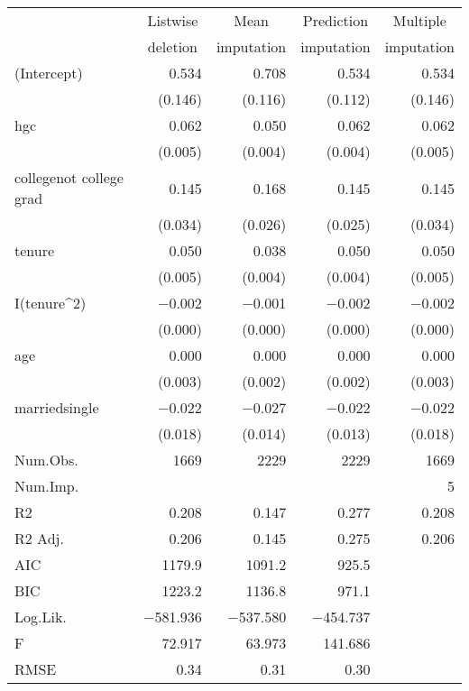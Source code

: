 \documentclass{article}
\begin{document}
\begin{table}[H]
\centering
\small
\begin{tabular}{lrrrr}
\toprule
& \multicolumn{1}{c}{Listwise} & \multicolumn{1}{c}{Mean} & \multicolumn{1}{c}{Prediction} & \multicolumn{1}{c}{Multiple} \\
& \multicolumn{1}{c}{deletion} & \multicolumn{1}{c}{imputation} & \multicolumn{1}{c}{imputation} & \multicolumn{1}{c}{imputation} \\
\midrule
(Intercept) & \num{0.534} & \num{0.708} & \num{0.534} & \num{0.534}\\
& (\num{0.146}) & (\num{0.116}) & (\num{0.112}) & (\num{0.146})\\
hgc & \num{0.062} & \num{0.050} & \num{0.062} & \num{0.062}\\
& (\num{0.005}) & (\num{0.004}) & (\num{0.004}) & \vphantom{1} (\num{0.005})\\
collegenot college grad & \num{0.145} & \num{0.168} & \num{0.145} & \num{0.145}\\
& (\num{0.034}) & (\num{0.026}) & (\num{0.025}) & (\num{0.034})\\
tenure & \num{0.050} & \num{0.038} & \num{0.050} & \num{0.050}\\
& (\num{0.005}) & (\num{0.004}) & (\num{0.004}) & (\num{0.005})\\
I(tenure\textasciicircum{}2) & \num{-0.002} & \num{-0.001} & \num{-0.002} & \num{-0.002}\\
& (\num{0.000}) & (\num{0.000}) & (\num{0.000}) & (\num{0.000})\\
age & \num{0.000} & \num{0.000} & \num{0.000} & \num{0.000}\\
& (\num{0.003}) & (\num{0.002}) & (\num{0.002}) & (\num{0.003})\\
marriedsingle & \num{-0.022} & \num{-0.027} & \num{-0.022} & \num{-0.022}\\
& (\num{0.018}) & (\num{0.014}) & (\num{0.013}) & (\num{0.018})\\
\midrule
Num.Obs. & \num{1669} & \num{2229} & \num{2229} & \num{1669}\\
Num.Imp. & & & & \num{5}\\
R2 & \num{0.208} & \num{0.147} & \num{0.277} & \num{0.208}\\
R2 Adj. & \num{0.206} & \num{0.145} & \num{0.275} & \num{0.206}\\
AIC & \num{1179.9} & \num{1091.2} & \num{925.5} & \\
BIC & \num{1223.2} & \num{1136.8} & \num{971.1} & \\
Log.Lik. & \num{-581.936} & \num{-537.580} & \num{-454.737} & \\
F & \num{72.917} & \num{63.973} & \num{141.686} & \\
RMSE & \num{0.34} & \num{0.31} & \num{0.30} & \\
\bottomrule
\end{tabular}
\end{table}
\end{document}
